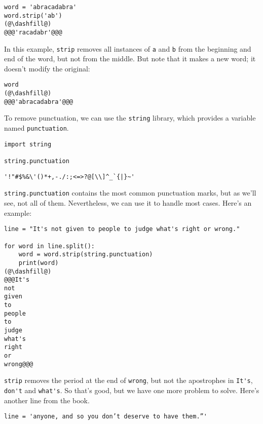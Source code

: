 \begin{lstlisting}[]
word = 'abracadabra'
word.strip('ab')
(@\dashfill@)
@@@'racadabr'@@@
\end{lstlisting}

In this example, \passthrough{\lstinline!strip!} removes all instances
of \passthrough{\lstinline!a!} and \passthrough{\lstinline!b!} from the
beginning and end of the word, but not from the middle. But note that it
makes a new word; it doesn't modify the original:

\begin{lstlisting}[]
word
(@\dashfill@)
@@@'abracadabra'@@@
\end{lstlisting}

To remove punctuation, we can use the \passthrough{\lstinline!string!}
library, which provides a variable named
\passthrough{\lstinline!punctuation!}.

\begin{lstlisting}[]
import string

string.punctuation
\end{lstlisting}

\begin{lstlisting}
'!"#$%&\'()*+,-./:;<=>?@[\\]^_`{|}~'
\end{lstlisting}

\passthrough{\lstinline!string.punctuation!} contains the most common
punctuation marks, but as we'll see, not all of them. Nevertheless, we
can use it to handle most cases. Here's an example:

\begin{lstlisting}[]
line = "It's not given to people to judge what's right or wrong."

for word in line.split():
    word = word.strip(string.punctuation)
    print(word)
(@\dashfill@)
@@@It's
not
given
to
people
to
judge
what's
right
or
wrong@@@
\end{lstlisting}

\passthrough{\lstinline!strip!} removes the period at the end of
\passthrough{\lstinline!wrong!}, but not the apostrophes in
\passthrough{\lstinline!It's!}, \passthrough{\lstinline!don't!} and
\passthrough{\lstinline!what's!}. So that's good, but we have one more
problem to solve. Here's another line from the book.

\begin{lstlisting}[]
line = 'anyone, and so you don’t deserve to have them.”'
\end{lstlisting}

